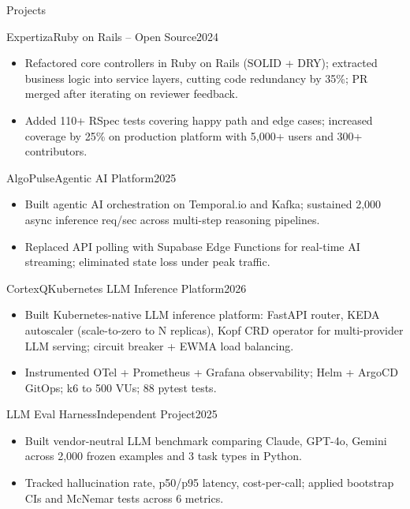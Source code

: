 \documentclass[]{mcdowellcv}
\begin{document}
\begin{cvsection}{Projects}
  \begin{cvsubsection}{Expertiza}{Ruby on Rails -- Open Source}{2024}
    \begin{itemize}
      \item Refactored core controllers in Ruby on Rails (SOLID + DRY); extracted business logic into service layers, cutting code redundancy by 35\%; PR merged after iterating on reviewer feedback.
      \item Added 110+ RSpec tests covering happy path and edge cases; increased coverage by 25\% on production platform with 5,000+ users and 300+ contributors.
    \end{itemize}
    \vspace{-1.5pt}
  \end{cvsubsection}

  \begin{cvsubsection}{AlgoPulse}{Agentic AI Platform}{2025}
    \begin{itemize}
      \item Built agentic AI orchestration on Temporal.io and Kafka; sustained 2,000 async inference req/sec across multi-step reasoning pipelines.
      \item Replaced API polling with Supabase Edge Functions for real-time AI streaming; eliminated state loss under peak traffic.
    \end{itemize}
    \vspace{-1.5pt}
  \end{cvsubsection}

  \begin{cvsubsection}{CortexQ}{Kubernetes LLM Inference Platform}{2026}
    \begin{itemize}
      \item Built Kubernetes-native LLM inference platform: FastAPI router, KEDA autoscaler (scale-to-zero to N replicas), Kopf CRD operator for multi-provider LLM serving; circuit breaker + EWMA load balancing.
      \item Instrumented OTel + Prometheus + Grafana observability; Helm + ArgoCD GitOps; k6 to 500 VUs; 88 pytest tests.
    \end{itemize}
    \vspace{-1.5pt}
  \end{cvsubsection}

  \begin{cvsubsection}{LLM Eval Harness}{Independent Project}{2025}
    \begin{itemize}
      \item Built vendor-neutral LLM benchmark comparing Claude, GPT-4o, Gemini across 2,000 frozen examples and 3 task types in Python.
      \item Tracked hallucination rate, p50/p95 latency, cost-per-call; applied bootstrap CIs and McNemar tests across 6 metrics.
    \end{itemize}
  \end{cvsubsection}
\end{cvsection}
\end{document}
